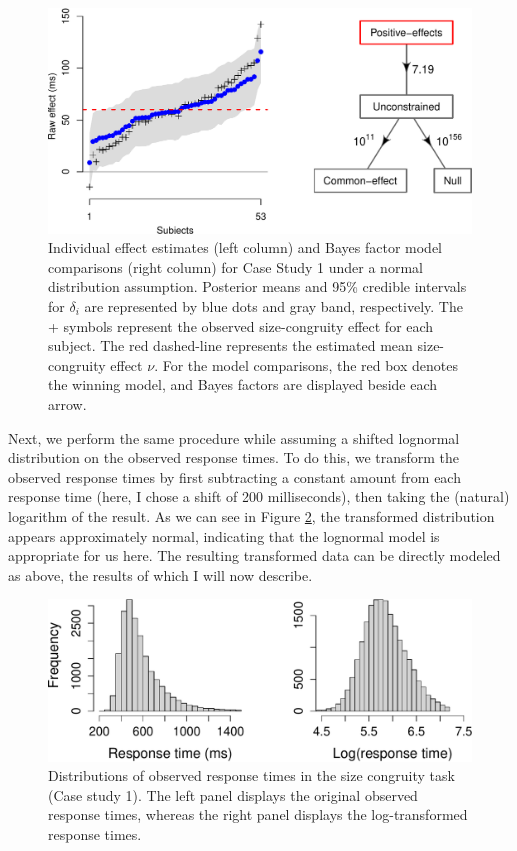 \documentclass[12pt,twoside,a4paper]{article}
\begin{document}
\begin{figure}[htbp]
\centering
\includegraphics[width=\textwidth]{plot1-1.pdf}
\caption{\label{fig:plot1}Individual effect estimates (left column) and Bayes factor model comparisons (right column) for Case Study 1 under a normal distribution assumption. Posterior means and 95\% credible intervals for \(\delta_i\) are represented by blue dots and gray band, respectively. The + symbols represent the observed size-congruity effect for each subject. The red dashed-line represents the estimated mean size-congruity effect \(\nu\). For the model comparisons, the red box denotes the winning model, and Bayes factors are displayed beside each arrow.}
\end{figure}

Next, we perform the same procedure while assuming a shifted lognormal distribution on the observed response times. To do this, we transform the observed response times by first subtracting a constant amount from each response time (here, I chose a shift of 200 milliseconds), then taking the (natural) logarithm of the result. As we can see in Figure \ref{fig:plotTransform1}, the transformed distribution appears approximately normal, indicating that the lognormal model is appropriate for us here. The resulting transformed data can be directly modeled as above, the results of which I will now describe.\\

\begin{figure}[htbp]
\centering
\includegraphics[width=\textwidth]{plotTransform1-1.pdf}
\caption{\label{fig:plotTransform1}Distributions of observed response times in the size congruity task (Case study 1). The left panel displays the original observed response times, whereas the right panel displays the log-transformed response times.}
\end{figure}
\end{document}
